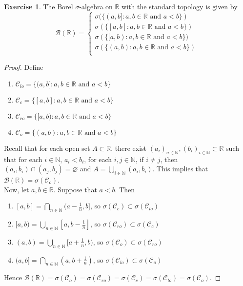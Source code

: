 \documentclass[12pt]{amsart}
\theoremstyle{definition}
\newtheorem{ex}[definition]{Exercise}
\newcommand{\sig}{\sigma}
\newcommand{\N}{\mathbb{N}}
\newcommand{\R}{\mathbb{R}}
\newcommand{\MC}{\mathcal{C}}
\newcommand{\MB}{\mathcal{B}}
\begin{document}
	\begin{ex}
		The Borel $\sigma$-algebra on $\R$ with the standard topology is given by 
		\[
		\MB(\R) =
		\begin{cases}
			\sig(\{(a,b]:a,b \in \R \text{ and } a<b\}) \\
			\sig(\{[a,b]:a,b \in \R \text{ and } a<b\}) \\
			\sig(\{[a,b):a,b \in \R \text{ and } a<b\}) \\
			\sig(\{(a,b):a,b \in \R \text{ and } a<b\}) \\
		\end{cases}
		\]
	\end{ex}
	
	\begin{proof}
		Define 
		\begin{enumerate}
			\item $\MC_{lo} = \{(a,b]:a,b \in \R \text{ and } a<b\}$\\
			\item $\MC_{c} = \{[a,b]:a,b \in \R \text{ and } a<b\}$\\
			\item $\MC_{ro} = \{[a,b):a,b \in \R \text{ and } a<b\}$\\
			\item $\MC_{o} = \{(a,b):a,b \in \R \text{ and } a<b\}$\\
		\end{enumerate} 
		Recall that for each open set $A \subset \R$, there exist $(a_i)_{n \in \N}, (b_i)_{i \in \N} \subset \R$ such that for each $i \in \N$, $a_i < b_i$, for each $i,j \in \N$, if $i \neq j$, then $(a_i,b_i) \cap (a_j, b_j) = \varnothing$ and $A = \bigcup\limits_{i \in \N}(a_i, b_i)$. This implies that $\MB(\R) = \sig(\MC_o)$. \vspace{2mm}\\
		Now, let $a,b \in \R$. Suppose that $a<b$. Then 
		\begin{enumerate}
			\item $[a,b] = \bigcap\limits_{n \in \N}(a- \frac{1}{n}, b]$, so $\sig(\MC_{c}) \subset \sig(\MC_{lo})$\\
			\item $[a,b) = \bigcup\limits_{n \in \N} [a,b-\frac{1}{n}]$, so $\sig(\MC_{ro}) \subset \sig(\MC_{c})$ \\
			\item $(a,b) = \bigcup\limits_{n \in \N} [a+\frac{1}{n},b)$, so $\sig(\MC_{o}) \subset \sig(\MC_{ro})$\\
			\item $(a,b] = \bigcap\limits_{n \in \N} (a,b+\frac{1}{n})$, so $\sig(\MC_{lo}) \subset \sig(\MC_{o})$\\
		\end{enumerate}
		Hence $\MB(\R) = \sig(\MC_o) = \sig(\MC_{ro}) = \sig(\MC_{c}) = \sig(\MC_{lo}) = \sig(\MC_{o})$. 
	\end{proof}
	
\end{document}
